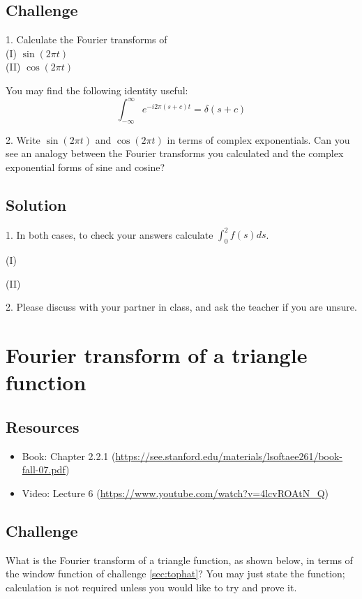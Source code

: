 \subsection*{Challenge}
1. Calculate the Fourier transforms of\\
(I) $\sin(2 \pi t)$\\
(II) $\cos(2 \pi t)$

You may find the following identity useful:
\begin{equation}
    \int_{-\infty}^{\infty} e^{-i 2 \pi (s+c) t} = \delta(s+c)
\end{equation}

2. Write $\sin(2 \pi t)$ and $\cos(2 \pi t)$ in terms of complex exponentials. Can you see an analogy between the Fourier transforms you calculated and the complex exponential forms of sine and cosine?

\subsection*{Solution}
1. In both cases, to check your answers calculate $\int_0^2 f(s) ds$.

(I)\\

(II)\\

2. Please discuss with your partner in class, and ask the teacher if you are unsure.



\newpage
\section{Fourier transform of a triangle function}
\label{sec:ft_triangle}

\subsection*{Resources}
\begin{itemize}
    \item Book: Chapter 2.2.1 (\url{https://see.stanford.edu/materials/lsoftaee261/book-fall-07.pdf})
    \item Video: Lecture 6 (\url{https://www.youtube.com/watch?v=4lcvROAtN_Q})
\end{itemize}

\subsection*{Challenge}
What is the Fourier transform of a triangle function, as shown below, in terms of the window function of challenge \ref{sec:tophat}? You may just state the function; calculation is not required unless you would like to try and prove it.

